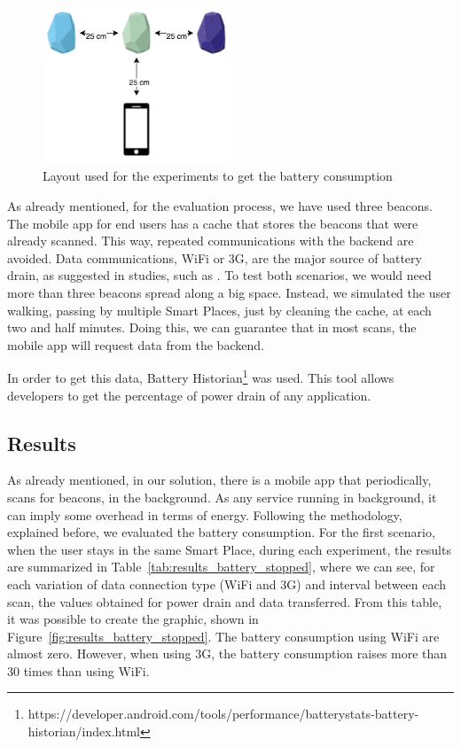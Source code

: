\begin{figure}[!ht]
  \centering
    \includegraphics[width=0.5\textwidth, keepaspectratio]{images/experiments_battery_layout}
    \caption[Layout for experiments of battery consumption]{Layout used for the experiments to get the battery consumption}
    \label{fig:layout_experiments_battery_consumption}
\end{figure}

As already mentioned, for the evaluation process, we have used three  beacons.
The mobile app for end users has a cache that stores the beacons that were already scanned.
This way, repeated communications with the backend are avoided.
Data communications, \gls{WiFi} or \gls{3G}, are the major source of battery drain, as suggested in studies, such as \cite{energy}.
To test both scenarios, we would need more than three beacons spread along a big space.
Instead, we simulated the user walking, passing by multiple Smart Places, just by cleaning the cache,
at each two and half minutes.
Doing this, we can guarantee that in most scans, the mobile app will request data from the backend.

In order to get this data, Battery Historian\footnote{https://developer.android.com/tools/performance/batterystats-battery-historian/index.html} was used. This tool allows developers to get the percentage of power drain of any application.

\subsection{Results}
\label{sub:evaluation_energy_consumption_results}
As already mentioned, in our solution, there is a mobile app that periodically, scans for beacons, in the background.
As any service running in background, it can imply some overhead in terms of energy.
Following the methodology, explained before, we evaluated the battery consumption.
For the first scenario, when the user stays in the same Smart Place, during each experiment, the results are summarized in Table~\ref{tab:results_battery_stopped}, where we can see, for each variation of data connection type (\gls{WiFi} and \gls{3G}) and interval between each scan, the values obtained for power drain and data transferred.
From this table, it was possible to create the graphic, shown in Figure~\ref{fig:results_battery_stopped}.
The battery consumption using \gls{WiFi} are almost zero.
However, when using \gls{3G}, the battery consumption raises more than 30 times than using \gls{WiFi}.

